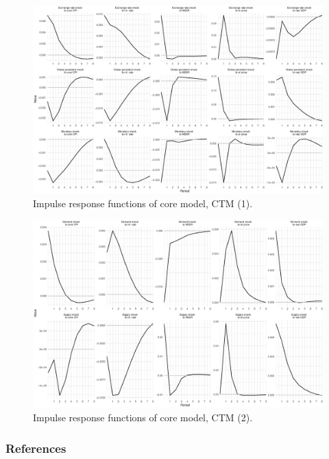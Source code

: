 \documentclass{beamer}
\begin{document}
\begin{frame}[noframenumbering]
	\label{coreirfs}
	\begin{figure}[h!]
		\centering
		\includegraphics[width=1\linewidth]{../Text/figures/irf_core_1}
		\caption[]{Impulse response functions of core model, CTM (1).}
		\label{fig:irf_core_1}
	\end{figure}
 
\end{frame}

\begin{frame}[noframenumbering]
	\begin{figure}[h!]
		\centering
		\includegraphics[width=1\linewidth]{../Text/figures/irf_core_2}
		\caption[]{Impulse response functions of core model, CTM (2).}
		\label{fig:irf_core_2}
	\end{figure}
\end{frame}

\begin{frame}
	\frametitle{References}
	\label{references}
	\tiny{
		\printbibliography[heading=none]}
\end{frame}
\end{document}
